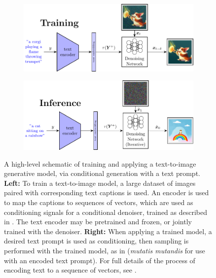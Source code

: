 \documentclass[../../book-main.tex]{subfiles}
\begin{document}
\begin{figure}[tbp]
  \centering
  \begin{subfigure}{0.47\textwidth}
    \includegraphics[width=\linewidth]{figs_chap6/tti-figure/tti-train.pdf}
    \caption{}
  \end{subfigure}
  \hfill
  \begin{subfigure}{0.47\textwidth}
    \includegraphics[width=\linewidth]{figs_chap6/tti-figure/tti-inf.pdf}
    \caption{}
  \end{subfigure}

  \caption{A high-level schematic of training and applying a text-to-image
  generative model, via conditional generation with a text prompt. \textbf{Left:}
  To train a text-to-image model, a large dataset of images paired with
  corresponding text captions is used. An encoder is used to map the captions to
  sequences of vectors, which are used as conditioning signals for a conditional
  denoiser, trained as described in . The text encoder may be
  pretrained and frozen, or jointly trained with the denoiser. \textbf{Right:}
  When applying a trained model, a desired text prompt is used as conditioning,
  then sampling is performed with the trained model, as in
   (\textit{mutatis mutandis} for
  use with an encoded text prompt). For full details of the process of encoding
  text to a sequence of vectors, see .}
  \label{fig:text-to-image}
\end{figure}
\end{document}
